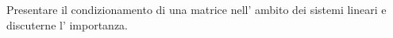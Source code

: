 Presentare  il condizionamento di una matrice nell' ambito dei sistemi lineari e discuterne l' importanza.
